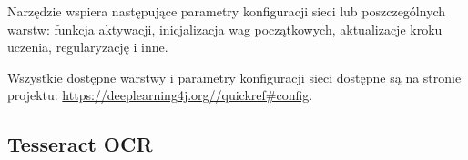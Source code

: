 \documentclass[a4paper,12pt]{article}
\begin{document}
		\par Narzędzie wspiera następujące parametry konfiguracji sieci lub poszczególnych warstw: funkcja aktywacji, inicjalizacja wag początkowych, 
			aktualizacje kroku uczenia, regularyzację i inne.
			\newline
		
            
		
        \par Wszystkie dostępne warstwy i parametry konfiguracji sieci dostępne są na stronie projektu:
			\href{https://deeplearning4j.org//quickref\#config}{\url{https://deeplearning4j.org//quickref\#config}}.
        
	\subsection{Tesseract OCR}
\end{document}
